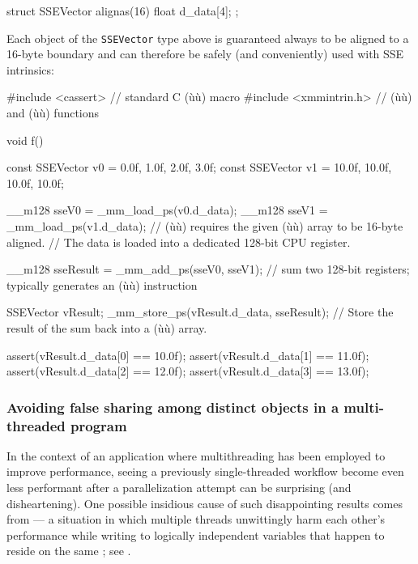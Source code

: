 \begin{emcppslisting}[emcppsbatch=e1]
struct SSEVector
{
    alignas(16) float d_data[4];
};
\end{emcppslisting}

\noindent Each object of the \lstinline!SSEVector! type above is guaranteed always to
be aligned to a 16-byte boundary and can therefore be safely (and
conveniently) used with SSE intrinsics:

\begin{emcppslisting}[emcppsbatch=e1]
#include <cassert>     // standard C (ù{}ù) macro
#include <xmmintrin.h> // (ù{}ù) and (ù{}ù) functions

void f()
{
    const SSEVector v0 = {0.0f, 1.0f, 2.0f, 3.0f};
    const SSEVector v1 = {10.0f, 10.0f, 10.0f, 10.0f};

    __m128 sseV0 = _mm_load_ps(v0.d_data);
    __m128 sseV1 = _mm_load_ps(v1.d_data);
        // (ù{}ù) requires the given (ù{}ù) array to be 16-byte aligned.
        // The data is loaded into a dedicated 128-bit CPU register.

    __m128 sseResult = _mm_add_ps(sseV0, sseV1);
        // sum two 128-bit registers; typically generates an (ù{}ù) instruction

    SSEVector vResult;
    _mm_store_ps(vResult.d_data, sseResult);
        // Store the result of the sum back into a (ù{}ù) array.

    assert(vResult.d_data[0] == 10.0f);
    assert(vResult.d_data[1] == 11.0f);
    assert(vResult.d_data[2] == 12.0f);
    assert(vResult.d_data[3] == 13.0f);
}
\end{emcppslisting}


\subsubsection[Avoiding false sharing among distinct objects in a multi-threaded program]{Avoiding false sharing among distinct objects in a multi-threaded program}\label{avoiding-false-sharing-among-distinct-objects-in-a-multi-threaded-program}

In the context of an application where multithreading has been employed
to improve performance, seeing
a previously single-threaded workflow become even less performant after
a parallelization attempt can be surprising (and disheartening). One possible insidious cause of such
disappointing results comes from  --- a situation
in which multiple threads unwittingly harm each other's performance
while writing to logically independent variables that happen to reside
on the same ; see .

